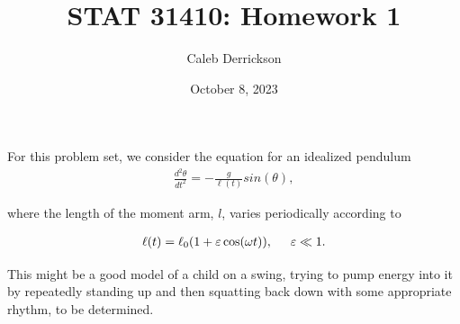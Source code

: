 \documentclass[12pt]{article}
\title{STAT 31410: Homework 1}
\author{Caleb Derrickson}
\date{October 8, 2023}
\newcommand{\jump}{\vspace{5mm}}
\newcommand{\ep}{\varepsilon}
\begin{document}
\onehalfspacing
\maketitle

For this problem set, we consider the equation for an idealized pendulum
\begin{align}
    \frac{d^2\theta}{dt^2} = -\frac{g}{\ell(t)}sin(\theta), \label{Original ode}
\end{align}

where the length of the moment arm, $l$, varies periodically according to

\begin{align}
    \ell (t) = \ell_0(1 + \ep \cos(\omega t)), \hspace{5mm} \ep \ll 1.    \label{length approx}
\end{align}

This might be a good model of a child on a swing, trying to pump energy into it by repeatedly
standing up and then squatting back down with some appropriate rhythm, to be determined.

\jump
\centerline{\noindent}%
\jump
\end{document}
